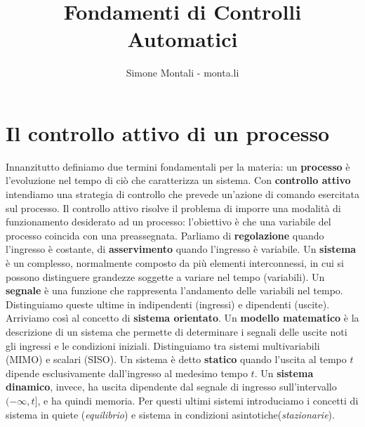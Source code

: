 \documentclass[11pt]{article}
\begin{document}
\author{Simone Montali - monta.li}
\title{Fondamenti di Controlli Automatici}

\maketitle

\medskip
\section{Il controllo attivo di un processo}
Innanzitutto definiamo due termini fondamentali per la materia: un \textbf{processo} è l'evoluzione nel tempo di ciò che caratterizza un sistema. Con \textbf{controllo attivo} intendiamo una strategia di controllo che prevede un'azione di comando esercitata sul processo. 
Il controllo attivo risolve il problema di imporre una modalità di funzionamento desiderato ad un processo: l'obiettivo è che una variabile del processo coincida con una preassegnata. Parliamo di \textbf{regolazione} quando l'ingresso è costante, di \textbf{asservimento} quando l'ingresso è variabile. 
Un \textbf{sistema} è un complesso, normalmente composto da più elementi interconnessi, in cui si possono distinguere grandezze soggette a variare nel tempo (variabili). Un \textbf{segnale} è una funzione che rappresenta l'andamento delle variabili nel tempo. Distinguiamo queste ultime in indipendenti (ingressi) e dipendenti (uscite). Arriviamo così al concetto di \textbf{sistema orientato}. Un \textbf{modello matematico} è la descrizione di un sistema che permette di determinare i segnali delle uscite noti gli ingressi e le condizioni iniziali. Distinguiamo tra sistemi multivariabili (MIMO) e scalari (SISO). Un sistema è detto \textbf{statico} quando l'uscita al tempo $t$ dipende esclusivamente dall'ingresso al medesimo tempo $t$. Un \textbf{sistema dinamico}, invece, ha uscita dipendente dal segnale di ingresso sull'intervallo $(-\infty , t]$, e ha quindi memoria. Per questi ultimi sistemi introduciamo i concetti di sistema in quiete (\textit{equilibrio}) e sistema in condizioni asintotiche(\textit{stazionarie}). 
\end{document}
